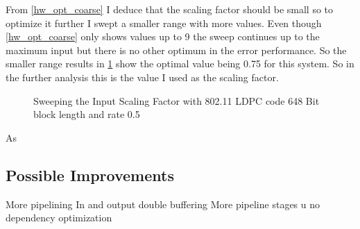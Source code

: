 From \cref{hw_opt_coarse} I deduce that the scaling factor should be small so to optimize it further I swept a smaller range with more values. Even though \cref{hw_opt_coarse} only shows values up to 9 the sweep continues up to the maximum input but there is no other optimum in the error performance. So the smaller range results in \cref{hw_opt_fine} show the optimal value being 0.75 for this system. So in the further analysis this is the value I used as the scaling factor.
\begin{figure}
    \centering
    \caption{Sweeping the Input Scaling Factor with 802.11 LDPC code 648 Bit block length and rate 0.5}
    \label{hw_opt_fine}
\end{figure}
As 

\subsection{Possible Improvements}
More pipelining
In and output double buffering
More pipeline stages
u no dependency optimization
